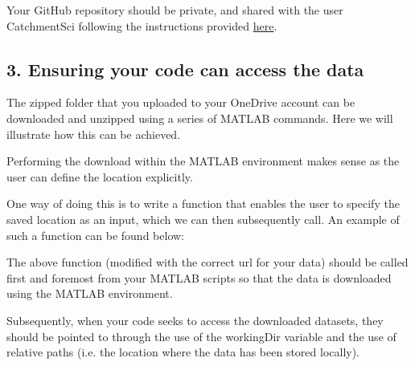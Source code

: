 \documentclass[11pt,onecolumn,a4paper,notitlepage]{article}
\begin{document}
\bigskip
\noindent Your GitHub repository should be private, and shared with the user CatchmentSci following the instructions provided \href{https://docs.github.com/en/account-and-profile/setting-up-and-managing-your-personal-account-on-github/managing-access-to-your-personal-repositories/inviting-collaborators-to-a-personal-repository}{here}.

\subsection*{3.	Ensuring your code can access the data}

\noindent
The zipped folder that you uploaded to your OneDrive account can be downloaded and unzipped using a series of MATLAB commands. Here we will illustrate how this can be achieved.

\bigskip
\noindent
Performing the download within the MATLAB environment makes sense as the user can define the location explicitly.

\bigskip
\noindent
One way of doing this is to write a function that enables the user to specify the saved location as an input, which we can then subsequently call. An example of such a function can be found below:

\bigskip


\bigskip
\noindent
The above function (modified with the correct url for your data) should be called first and foremost from your MATLAB scripts so that the data is downloaded using the MATLAB environment.

\bigskip
\noindent
Subsequently, when your code seeks to access the downloaded datasets, they should be pointed to through the use of the workingDir variable and the use of relative paths (i.e. the location where the data has been stored locally).
\end{document}
